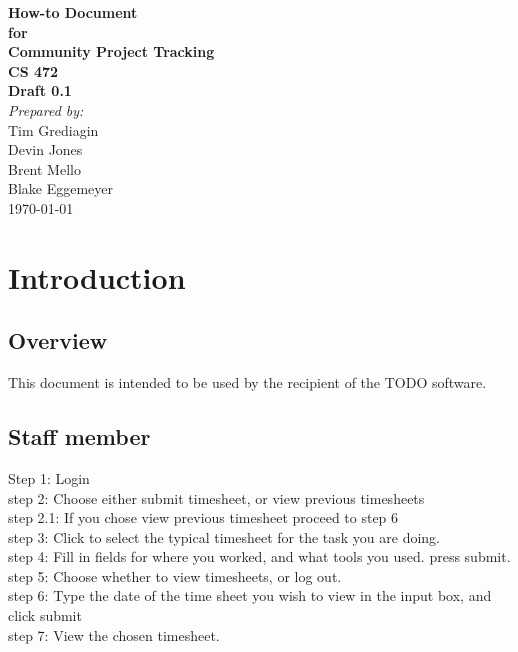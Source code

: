 \documentclass[12pt]{article}
\begin{document}

\begin{titlepage}
\begin{flushright} 
{\LARGE \bfseries How-to Document}\\[1.2cm]
{\large \bfseries for}\\[1.2cm]
{\huge \bfseries Community Project Tracking}\\[1.2cm]
{\large \bfseries CS 472}\\
\vfill
{\large \bfseries Draft 0.1}\\[2cm]
\emph{Prepared by:} \\
Tim Grediagin\\
Devin Jones\\
Brent Mello\\
Blake Eggemeyer \\ [3cm]
{\large \today}
\\[2cm]
\end{flushright}
\end{titlepage}
\setcounter{tocdepth}{3}
\setcounter{secnumdepth}{5}
\newpage

\section{Introduction}


\subsection{Overview}
This document is intended to be used by the recipient of the TODO software.

\subsection{Staff member}
Step 1: Login\\
step 2: Choose either submit timesheet, or view previous timesheets\\
step 2.1: If you chose view previous timesheet proceed to step 6\\
step 3: Click to select the typical timesheet for the task you are doing.\\
step 4: Fill in fields for where you worked, and what tools you used. press submit.\\
step 5: Choose whether to view timesheets, or log out.\\
step 6: Type the date of the time sheet you wish to view in the input box, and click submit\\
step 7: View the chosen timesheet.\\
\end{document}
